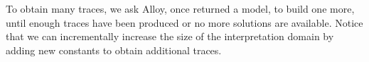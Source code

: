 To obtain many traces, we ask Alloy, once returned a model,
to build one more, until enough traces have been
produced or no more solutions are available.
Notice that we can incrementally increase the size of the
interpretation domain by adding new constants to obtain
additional traces.


